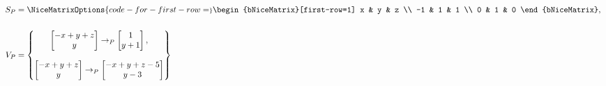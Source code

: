 \begin{align*}
S_P &= 
\NiceMatrixOptions{code-for-first-row=\scriptstyle}
	\begin{bNiceMatrix}[first-row=1]
		x & y & z \\
		-1 & 1 & 1 \\
		0 & 1 & 0
	\end{bNiceMatrix}, \ \\ \\
    V_P &= \begin{Bmatrix}
              \begin{bmatrix}
                    - x + y + z \\
                    y
               \end{bmatrix} \rightarrow_P
               \begin{bmatrix}
                     1 \\
                     y + 1
               \end{bmatrix}, \\ \\
               \begin{bmatrix}
                     - x + y + z \\
                    y
               \end{bmatrix} \rightarrow_P
               \begin{bmatrix}
                    - x + y + z - 5 \\
                    y - 3
              \end{bmatrix}
    \end{Bmatrix}
\end{align*}
